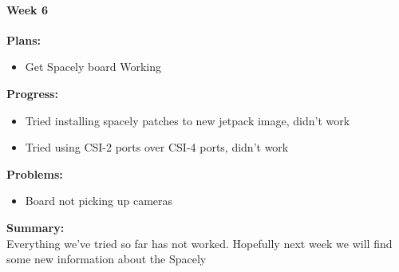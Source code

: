 \paragraph{Week 6}
\begin{adjustwidth}{2.5em}{0pt}
    \vspace{-0.5cm}\textbf{Plans:}
    \vspace{-0.5cm}
    \begin{itemize}
        \item Get Spacely board Working
    \end{itemize} 
    \vspace{-0.3cm}\textbf{Progress:}
    \vspace{-0.5cm}
    \begin{itemize}
        \item Tried installing spacely patches to new jetpack image, didn't work
        \item Tried using CSI-2 ports over CSI-4 ports, didn't work
    \end{itemize} 
    \vspace{-0.3cm}\textbf{Problems:}
    \vspace{-0.5cm}
    \begin{itemize}
        \item Board not picking up cameras
    \end{itemize}  
    \vspace{-0.3cm}\noindent\textbf{Summary:}\\
    \noindent 
    Everything we've tried so far has not worked. Hopefully next week we will find some new information about the Spacely
\end{adjustwidth} 

